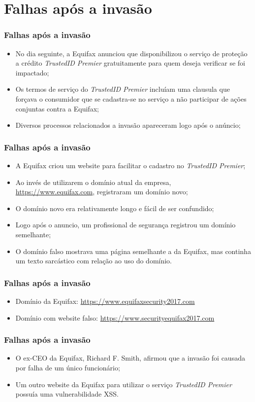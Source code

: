 \documentclass{beamer}
\begin{document}
	\section{Falhas após a invasão}
	\begin{frame}
		\frametitle{Falhas após a invasão}
		\begin{itemize}
			\item No dia seguinte, a Equifax anunciou que disponibilizou o serviço de proteção a crédito \textit{TrustedID Premier} gratuitamente para quem deseja verificar se foi impactado;
			\item Os termos de serviço do \textit{TrustedID Premier} incluíam uma clausula que forçava o consumidor que se cadastra-se no serviço a não participar de ações conjuntas contra a Equifax;
			\item Diversos processos relacionados a invasão apareceram logo após o anúncio;
		\end{itemize}
	\end{frame}
	\begin{frame}
		\frametitle{Falhas após a invasão}
		\begin{itemize}
			\item A Equifax criou um website para facilitar o cadastro no \textit{TrustedID Premier};
			\item Ao invés de utilizarem o domínio atual da empresa, \url{https://www.equifax.com}, registraram um domínio novo;
			\item O domínio novo era relativamente longo e fácil de ser confundido;
			\item Logo após o anuncio, um profissional de segurança registrou um domínio semelhante;
			\item O domínio falso mostrava uma página semelhante a da Equifax, mas continha um texto sarcástico com relação ao uso do domínio. 
		\end{itemize}
	\end{frame}
	\begin{frame}
		\frametitle{Falhas após a invasão}
			\begin{itemize}
				\item Domínio da Equifax: \url{https://www.equifaxsecurity2017.com}
				\item Domínio com website falso: \url{https://www.securityequifax2017.com}
			\end{itemize}
	\end{frame}
	\begin{frame}
		\frametitle{Falhas após a invasão}
		\begin{itemize}
			\item O ex-CEO da Equifax, Richard F. Smith, afirmou que a invasão foi causada por falha de um único funcionário;
			\item Um outro website da Equifax para utilizar o serviço \textit{TrustedID Premier} possuía uma vulnerabilidade XSS.
		\end{itemize}
	\end{frame}
\end{document}
